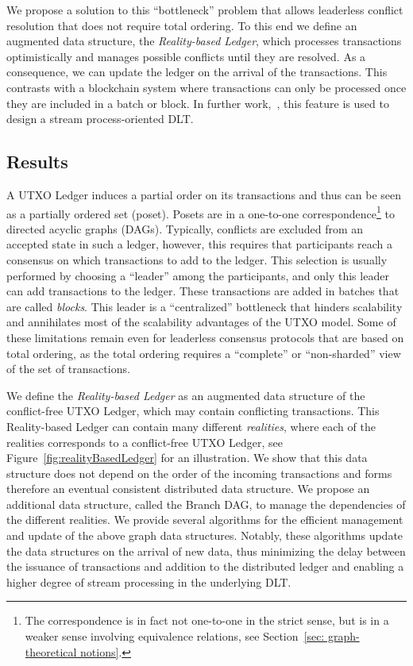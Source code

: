 \documentclass[11pt]{article}
\theoremstyle{plain}
\theoremstyle{definition}
\numberwithin{definition}{section}
\numberwithin{lemma}{section}
\numberwithin{ass}{section}
\numberwithin{remark}{section}
\numberwithin{example}{section}
\numberwithin{proposition}{section}
\numberwithin{theorem}{section}
\begin{document}
We propose a solution to this ``bottleneck'' problem that allows leaderless conflict resolution that does not require total ordering. To this end we define  an augmented data structure, the \emph{Reality-based Ledger}, which processes transactions optimistically and manages possible conflicts until they are resolved. 
As a consequence, we can update the ledger on the arrival of the transactions. This contrasts with a blockchain system where transactions can only be processed once they are included in a batch or block. In further work,~\cite{OTV}, this feature is used to design a stream process-oriented DLT.  




\subsection{Results}
A UTXO Ledger induces a partial order on its transactions and thus can be seen as a partially ordered set (poset). Posets are in a one-to-one correspondence\footnote{The correspondence is in fact not one-to-one in the strict sense, but is in a weaker sense involving equivalence relations, see Section~\ref{sec: graph-theoretical notions}.} to directed acyclic graphs (DAGs). Typically, conflicts are excluded from an accepted state in such a ledger, however, this requires that participants reach a consensus on which transactions to add to the ledger. This selection is usually performed by choosing a ``leader'' among the participants, and only this leader can add transactions to the ledger. These transactions are added in batches that are called \emph{blocks}. This leader is a ``centralized'' bottleneck that hinders scalability and annihilates most of the scalability advantages of the UTXO model. Some of these limitations remain even for leaderless consensus protocols that are based on total ordering, as the total ordering requires a ``complete'' or ``non-sharded'' view of the set of transactions.

We define the \textit{Reality-based Ledger} as an augmented data structure of the conflict-free  UTXO Ledger, which may contain conflicting transactions. This Reality-based Ledger can contain many different \emph{realities}, where each of the realities corresponds to a conflict-free  UTXO Ledger, see Figure~\ref{fig:realityBasedLedger} for an illustration. We show that this data structure does not depend on the order of the incoming transactions and forms therefore an eventual consistent distributed data structure. We propose an additional data structure, called the Branch DAG, to manage the dependencies of the different realities. We provide several algorithms for the efficient management and update of the above graph data structures. %
Notably, these algorithms update the data structures on the arrival of new data, thus minimizing the delay between the issuance of transactions and addition to the distributed ledger and enabling a higher degree of stream processing in the underlying DLT.
 
\end{document}
